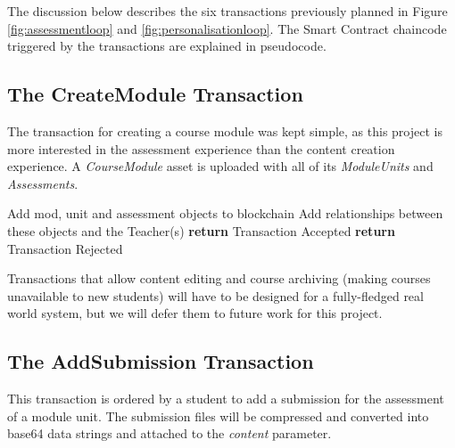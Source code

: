 The discussion below describes the six transactions previously planned in Figure \ref{fig:assessmentloop} and \ref{fig:personalisationloop}.
The Smart Contract chaincode triggered by the transactions are explained in pseudocode.

\subsection{The CreateModule Transaction}

The transaction for creating a course module was kept simple, as this project is more interested in the assessment experience than the
content creation experience. A \textit{CourseModule} asset is uploaded with all of its \textit{ModuleUnits} and \textit{Assessments}.

\begin{algorithm}
	\begin{algorithmic}[0]
		\State Add mod, unit and assessment objects to blockchain
		\State Add relationships between these objects and the Teacher(s)
		\State \textbf{return} Transaction Accepted
		\Else
		\State \textbf{return} Transaction Rejected
		\EndIf
		\EndFunction
	\end{algorithmic}
\end{algorithm}

Transactions that allow content editing and course archiving (making courses unavailable to new students) will have to be designed
for a fully-fledged real world system, but we will defer them to future work for this project.

\subsection{The AddSubmission Transaction}

This transaction is ordered by a student to add a submission for the assessment of a module unit. The submission files will be
compressed and converted into base64 data strings and attached to the \textit{content} parameter.

